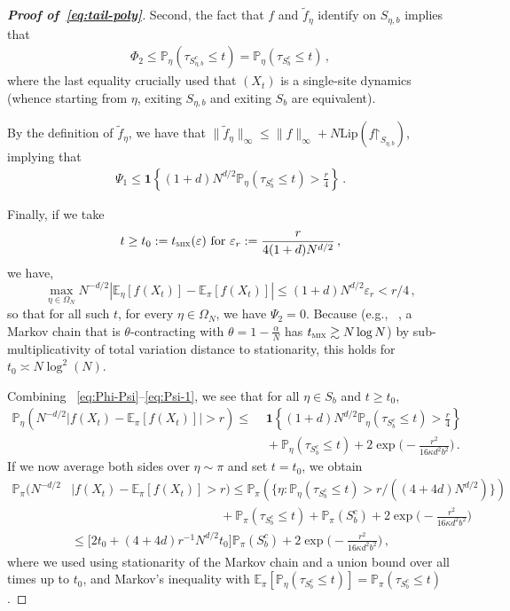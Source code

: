 \documentclass[reqno,11pt]{amsart}
\numberwithin{equation}{section}
\renewcommand{\restriction}{\mathord{\upharpoonright}}
\renewcommand{\epsilon}{\varepsilon}
\theoremstyle{definition}{
\newtheorem{example}[theorem]{Example}
\newtheorem{definition}[theorem]{Definition}
\newtheorem*{definition*}{Definition}
\newtheorem{problem}[theorem]{Problem}
\newtheorem{question}[theorem]{Question}
\newtheorem{remark}[theorem]{Remark}
}
\newcommand{\E}{\mathbb E}
\renewcommand{\P}{\mathbb P}
\renewcommand{\epsilon}{\varepsilon}
\newcommand{\tmix}{t_{\textsc{mix}}}
\begin{document}
\begin{proof}[\textbf{\emph{Proof of~\eqref{eq:tail-poly}}}]
Second, the fact that $f$ and $\tilde f_\eta$ identify on $S_{\eta,b}$ implies that
\begin{align}\label{eq:phi-1} \Phi_2 \leq  \P_{\eta} (\tau_{S_{\eta,b}^c} \leq t)= \P_{\eta} (\tau_{S_b^c}\leq t)\,,\end{align}
where the last equality crucially used that $(X_t)$ is a single-site dynamics (whence starting from $\eta$, exiting $S_{\eta,b}$ and exiting $S_{b}$ are equivalent). 

By the definition of $\tilde f_\eta$, we have that $\|\tilde f_\eta\|_\infty \leq \|f\|_\infty +  N \mathrm{Lip}(f\restriction_{S_{\eta,b}})$, implying that
\begin{align}\label{eq:Psi-1}
\Psi_1 \leq \boldsymbol 1\left\{ (1+d)  N^{d/2} \mathbb P_{\eta} (\tau_{S_b^c} \leq t)>\tfrac r4\right\}\,.
\end{align}

Finally, if we take
\[ t \geq t_0 := \tmix( \epsilon)\mbox{ for }\epsilon_r := \frac{r}{4(1+d)  N^{d/2}}\,, \]
we have,
\[ \max_{\eta\in\Omega_N} N^{-d/2} \left|\E_\eta[f(X_t)] - \E_\pi[f(X_t)]\right| \leq (1+d) N^{d/2} \epsilon_r < r/4\,,\]
so that for all such $t$, for every $\eta\in \Omega_N$, we have $\Psi_2 = 0$. Because (e.g., ~\cite{LPW09}, a Markov chain that is $\theta$-contracting with $\theta= 1-\frac {\alpha}N$ has $\tmix \gtrsim N\log N$) by sub-multiplicativity of total variation distance to stationarity, this holds for $t_0 \asymp N\log^2 ( N)$. 

Combining ~\eqref{eq:Phi-Psi}--\eqref{eq:Psi-1}, we see that for all $\eta \in S_b$ and $t\geq t_0$, 
\begin{align*}
\mathbb P_{\eta} (N^{-d/2} |f(X_t) - \mathbb E_\pi [f(X_t)] | >r) \leq & \,\, \boldsymbol 1\left\{(1+d)  N^{d/2} \mathbb P_{\eta} (\tau_{S_b^c} \leq t)>\tfrac r4\right\} \\ 
& \,\,+ \mathbb P_{\eta} (\tau_{S_b^c} \leq t)+ 2\exp \bigg( - \frac{r^2}{16\kappa d^2 b^2}\bigg)\,.
\end{align*}
If we now average both sides over $\eta\sim \pi$ and set $t=t_0$, we obtain
\begin{align}\label{eq:intermediate-bound}
\mathbb P_{\pi} \Big(N^{-d/2} &|f(X_t)-\mathbb E_{\pi} [ f(X_t)]>r\Big)  \leq  \mathbb P_{\pi} (\{\eta: \mathbb P_{\eta} (\tau_{S_b^c} \leq t)> r/((4+4d) N^{d/2})\}) \nonumber \\ 
& \qquad\qquad\qquad\qquad\qquad\qquad + \mathbb P_{\pi} (\tau_{S_b^c} \leq t) + \mathbb P_{\pi} (S_b^c) + 2 \exp\bigg(-\frac{r^2}{16\kappa d^2 b^2}\bigg) \nonumber \\
& \leq \bigg[2t_0+ {(4+4d)r^{-1}N^{d/2} t_0}\bigg] \mathbb P_{\pi} (S_b^c) 
+ 2 \exp\bigg(-\frac {r^2}{16\kappa d^2 b^2}\bigg)\,,
\end{align}
where we used using stationarity of the Markov chain and a union bound over all times up to $t_0$, and Markov's inequality with $\mathbb E_{\pi} [ \mathbb P_{\eta} (\tau_{S_b^c}\leq t)] = \mathbb P_{\pi} (\tau_{S_b^c} \leq t)$.  


\end{proof}
\end{document}
